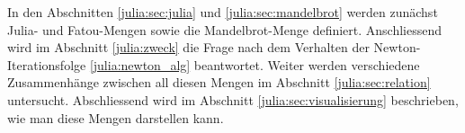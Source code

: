 \begin{refsection}
In den Abschnitten \eqref{julia:sec:julia} und \eqref{julia:sec:mandelbrot} werden zunächst Julia- und Fatou-Mengen sowie die Mandelbrot-Menge definiert.
Anschliessend wird im Abschnitt \eqref{julia:zweck} die Frage nach dem Verhalten der Newton-Iterationsfolge \eqref{julia:newton_alg} beantwortet.
Weiter werden verschiedene Zusammenhänge zwischen all diesen Mengen im Abschnitt \eqref{julia:sec:relation} untersucht.
Abschliessend wird im Abschnitt \eqref{julia:sec:visualisierung} beschrieben, wie man diese Mengen darstellen kann.








\printbibliography[heading=subbibliography]
\end{refsection}
